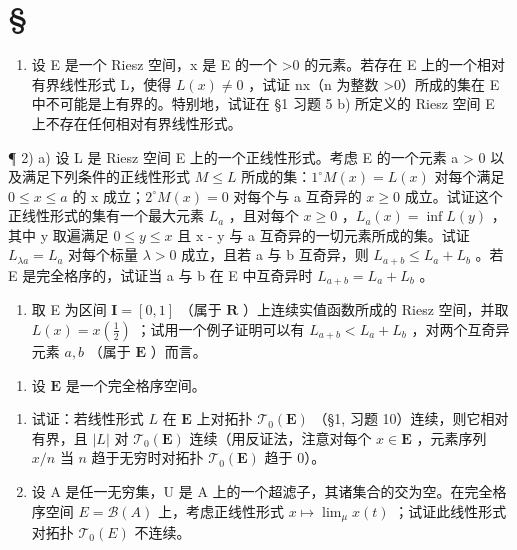 \section*{\texorpdfstring{\S\CurrentExerciseGroup}{第{\CurrentExerciseGroup}节}}
{}

\begin{enumerate}
\def\labelenumi{\arabic{enumi})}
\tightlist
\item
  设 E 是一个 Riesz 空间，x 是 E 的一个 \textgreater0 的元素。若存在 E 上的一个相对有界线性形式 L，使得 \(L(x) \neq 0\) ，试证 nx（n 为整数 \textgreater0）所成的集在 E 中不可能是上有界的。特别地，试证在 §1 习题 5 b) 所定义的 Riesz 空间 E 上不存在任何相对有界线性形式。
\end{enumerate}

¶ 2) a) 设 L 是 Riesz 空间 E 上的一个正线性形式。考虑 E 的一个元素 a \textgreater{} 0 以及满足下列条件的正线性形式 \(M \leqslant L\) 所成的集：\(1^{\circ} M(x) = L(x)\) 对每个满足 \(0 \leqslant x \leqslant a\) 的 x 成立；\(2^{\circ} M(x) = 0\) 对每个与 a 互奇异的 \(x \geqslant 0\) 成立。试证这个正线性形式的集有一个最大元素 \(L_{a}\) ，且对每个 \(x \geqslant 0\) ，\(L_{a}(x) = \inf L(y)\) ，其中 y 取遍满足 \(0 \leqslant y \leqslant x\) 且 x - y 与 a 互奇异的一切元素所成的集。试证 \(L_{\lambda a} = L_{a}\) 对每个标量 \(\lambda > 0\) 成立，且若 a 与 b 互奇异，则 \(L_{a+b} \leqslant L_{a} + L_{b}\) 。若 E 是完全格序的，试证当 a 与 b 在 E 中互奇异时 \(L_{a+b} = L_{a} + L_{b}\) 。

\begin{enumerate}
\def\labelenumi{\alph{enumi})}
\setcounter{enumi}{1}
\tightlist
\item
  取 E 为区间 \(\mathbf{I} = [0,1]\) （属于 \(\mathbf{R}\) ）上连续实值函数所成的 Riesz 空间，并取 \(L(x) = x\left(\frac{1}{2}\right)\) ；试用一个例子证明可以有 \(L_{a + b} < L_a + L_b\) ，对两个互奇异元素 \(a, b\) （属于 \(\mathbf{E}\) ）而言。
\end{enumerate}

\begin{enumerate}
\def\labelenumi{\arabic{enumi})}
\setcounter{enumi}{2}
\tightlist
\item
  设 \(\mathbf{E}\) 是一个完全格序空间。
\end{enumerate}

\begin{enumerate}
\def\labelenumi{\alph{enumi})}
\item
  试证：若线性形式 \(L\) 在 \(\mathbf{E}\) 上对拓扑 \(\mathcal{T}_0(\mathbf{E})\) （§1, 习题 10）连续，则它相对有界，且 \(|L|\) 对 \(\mathcal{T}_0(\mathbf{E})\) 连续（用反证法，注意对每个 \(x \in \mathbf{E}\) ，元素序列 \(x / n\) 当 \(n\) 趋于无穷时对拓扑 \(\mathcal{T}_0(\mathbf{E})\) 趋于 0）。
\item
  设 A 是任一无穷集，U 是 A 上的一个超滤子，其诸集合的交为空。在完全格序空间 \(E = \mathcal{B}(A)\) 上，考虑正线性形式 \(x \mapsto \lim_{\mu} x(t)\) ；试证此线性形式对拓扑 \(\mathcal{T}_{0}(E)\) 不连续。
\end{enumerate}

